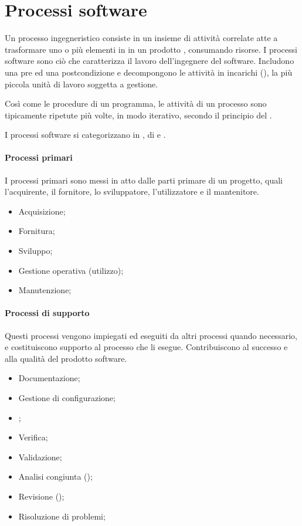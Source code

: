 \section{Processi software}

Un \gls{processo} ingegneristico consiste in un insieme di attività correlate
atte a trasformare uno o più elementi in  in un prodotto
, consumando risorse. I processi software sono ciò che
caratterizza il lavoro dell'ingegnere del software. Includono una pre ed una
postcondizione e decompongono le attività in incarichi (), la più
piccola unità di lavoro soggetta a gestione.

Così come le procedure di un programma, le attività di un processo sono
tipicamente ripetute più volte, in modo iterativo, secondo il principio del
.


I processi software si categorizzano in , di  e
.

\paragraph{Processi primari}

I processi primari sono messi in atto dalle parti primare di un progetto, quali
l'acquirente, il fornitore, lo sviluppatore, l'utilizzatore e il mantenitore.

\begin{itemize}
  \item Acquisizione;
  \item Fornitura;
  \item Sviluppo;
  \item Gestione operativa (utilizzo);
  \item Manutenzione;
\end{itemize}

\paragraph{Processi di supporto}

Questi processi vengono impiegati ed eseguiti da altri processi quando
necessario, e costituiscono supporto al processo che li esegue. Contribuiscono
al successo e alla qualità del prodotto software.

\begin{itemize}
  \item Documentazione;
  \item Gestione di configurazione;
  \item {};
  \item Verifica;
  \item Validazione;
  \item Analisi congiunta ();
  \item Revisione ();
  \item Risoluzione di problemi;
\end{itemize}

